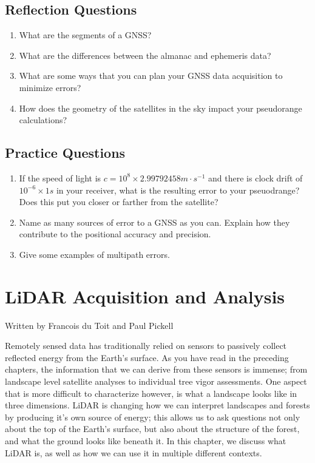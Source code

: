 \documentclass[
]{book}
\providecommand{\tightlist}{%
  \setlength{\itemsep}{0pt}\setlength{\parskip}{0pt}}
\begin{document}
\section*{Reflection Questions}\label{reflection-questions-9}

\begin{enumerate}
\def\labelenumi{\arabic{enumi}.}
\tightlist
\item
  What are the segments of a GNSS?
\item
  What are the differences between the almanac and ephemeris data?
\item
  What are some ways that you can plan your GNSS data acquisition to minimize errors?
\item
  How does the geometry of the satellites in the sky impact your pseudorange calculations?
\end{enumerate}

\section*{Practice Questions}\label{practice-questions-4}

\begin{enumerate}
\def\labelenumi{\arabic{enumi}.}
\tightlist
\item
  If the speed of light is \(c = 10^{8} × 2.99792458 m·s^{-1}\) and there is clock drift of \(10^{-6} × 1 s\) in your receiver, what is the resulting error to your pseuodrange? Does this put you closer or farther from the satellite?
\item
  Name as many sources of error to a GNSS as you can. Explain how they contribute to the positional accuracy and precision.
\item
  Give some examples of multipath errors.
\end{enumerate}

\chapter{LiDAR Acquisition and Analysis}\label{LiDAR-acquisition-and-analysis}

Written by
Francois du Toit and Paul Pickell

Remotely sensed data has traditionally relied on sensors to passively collect reflected energy from the Earth's surface. As you have read in the preceding chapters, the information that we can derive from these sensors is immense; from landscape level satellite analyses to individual tree vigor assessments. One aspect that is more difficult to characterize however, is what a landscape looks like in three dimensions. LiDAR is changing how we can interpret landscapes and forests by producing it's own source of energy; this allows us to ask questions not only about the top of the Earth's surface, but also about the structure of the forest, and what the ground looks like beneath it. In this chapter, we discuss what LiDAR is, as well as how we can use it in multiple different contexts.
\end{document}

